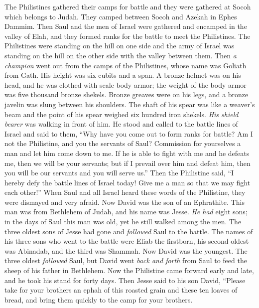 \begin{biblechapter} %
 The Philistines gathered their camps for battle and they were gathered at Socoh which belongs to Judah. They camped between Socoh and Azekah in Ephes Dammim.
\verse Then Saul and the men of Israel were gathered and encamped in the valley of Elah, and they formed ranks for the battle to meet the Philistines.
\verse The Philistines were standing on the hill on one side and the army of Israel was standing on the hill on the other side with the valley between them.
\verse Then \textit{a champion} went out from the camps of the Philistines, whose name was Goliath from Gath. His height was six cubits and a span.
\verse A bronze helmet was on his head, and he was clothed with scale body armor; the weight of the body armor was five thousand bronze shekels.
\verse Bronze greaves were on his legs, and a bronze javelin was slung between his shoulders.
\verse The shaft of his spear was like a weaver’s beam and the point of his spear weighed six hundred iron shekels. \textit{His shield bearer} was walking in front of him.
\verse He stood and called to the battle lines of Israel and said to them, “Why have you come out to form ranks for battle? Am I not the Philistine, and you the servants of Saul? Commission for yourselves a man and let him come down to me.
\verse If he is able to fight with me and he defeats me, then we will be your servants; but if I prevail over him and defeat him, then you will be our servants and you will serve us.”
\verse Then the Philistine said, “I hereby defy the battle lines of Israel today! Give me a man so that we may fight each other!”
\verse When Saul and all Israel heard these words of the Philistine, they were dismayed and very afraid.
 Now David was the son of an Ephrathite. This man was from Bethlehem of Judah, and his name was Jesse. \textit{He had} eight sons; in the days of Saul this man was old, yet he still walked among the men.
\verse The three oldest sons of Jesse had gone and \textit{followed} Saul to the battle. The names of his three sons who went to the battle were Eliab the firstborn, his second oldest was Abinadab, and the third was Shammah.
\verse Now David was the youngest. The three oldest \textit{followed} Saul,
\verse but David went \textit{back and forth} from Saul to feed the sheep of his father in Bethlehem.
\verse Now the Philistine came forward early and late, and he took his stand for forty days.
\verse Then Jesse said to his son David, “Please take for your brothers an ephah of this roasted grain and these ten loaves of bread, and bring them quickly to the camp for your brothers.

\end{biblechapter}
